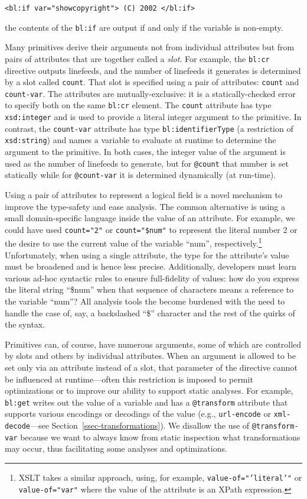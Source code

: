 \documentclass{www2003-submission}
\newcommand{\smtexttt}[1]{{\small\texttt{#1}}}
\newcommand{\ssecref}[1]{Section~\ref{ssec-#1}}
\begin{document}
\smtexttt{<bl:if var="showcopyright"> (C) 2002 </bl:if>}

\noindent the contents of the \smtexttt{bl:if} are output if and
only if the variable is non-empty.

Many primitives derive their arguments not from individual attributes
but from pairs of attributes that are together called a \emph{slot}.  For
example, the \smtexttt{bl:cr} directive outputs linefeeds, and the
number of linefeeds it generates is determined by a slot called
\smtexttt{count}.  That slot is specified using a pair of attributes:
\smtexttt{count} and \smtexttt{count-var}.  The attributes are
mutually-exclusive: it is a statically-checked error to specify both on
the same \smtexttt{bl:cr} element.  The \smtexttt{count} attribute has
type \smtexttt{xsd:integer} and is used to provide a literal integer
argument to the primitive.  In contrast, the \smtexttt{count-var}
attribute has type \smtexttt{bl:identifierType} (a restriction of
\smtexttt{xsd:string}) and names a variable to evaluate at runtime to
determine the argument to the primitive.  In both cases, the integer
value of the argument is used as the number of linefeeds to generate,
but for \smtexttt{@count} that number is set statically while for
\smtexttt{@count-var} it is determined dynamically (at run-time).

Using a pair of attributes to represent a logical field is a novel
mechanism to improve the type-safety and ease analysis.  The common
alternative is using a small domain-specific language inside the value
of an attribute.  For example, we could have used \smtexttt{count="2"}
or \smtexttt{count="\$num"} to represent the literal number 2 or the
desire to use the current value of the variable ``num'',
respectively.\footnote{XSLT takes a similar approach, using, for example,
\smtexttt{value-of="'literal'"} or \smtexttt{value-of="var"} where the
value of the attribute is an XPath expression.}
Unfortunately, when using a single attribute, the type for the
attribute's value must be broadened and is hence less precise.
Additionally, developers must learn various ad-hoc syntactic rules to
ensure full-fidelity of values:  how do you express the literal string
``\$num'' when that sequence of characters means a reference to the
variable ``num''?  All analysis tools the become burdened with the
need to handle the case of, say, a backslashed ``\$'' character and
the rest of the quirks of the syntax.

Primitives can, of course, have numerous arguments, some of which are
controlled by slots and others by individual attributes.  When an
argument is allowed to be set only via an attribute instead of a slot,
that parameter of the directive cannot be influenced at
runtime---often this restriction is imposed to permit optimizations or
to improve our ability to support static analyses.  For example,
\smtexttt{bl:get} writes out the value of a variable and has a
\smtexttt{@transform} attribute that supports various encodings or
decodings of the value (e.g., \smtexttt{url-encode} or
\smtexttt{xml-decode}---see \ssecref{transformations}).  We disallow the
use of \smtexttt{@transform-var} because we want to always know from
static inspection what transformations may occur, thus facilitating
some analyses and optimizations.
\end{document}
